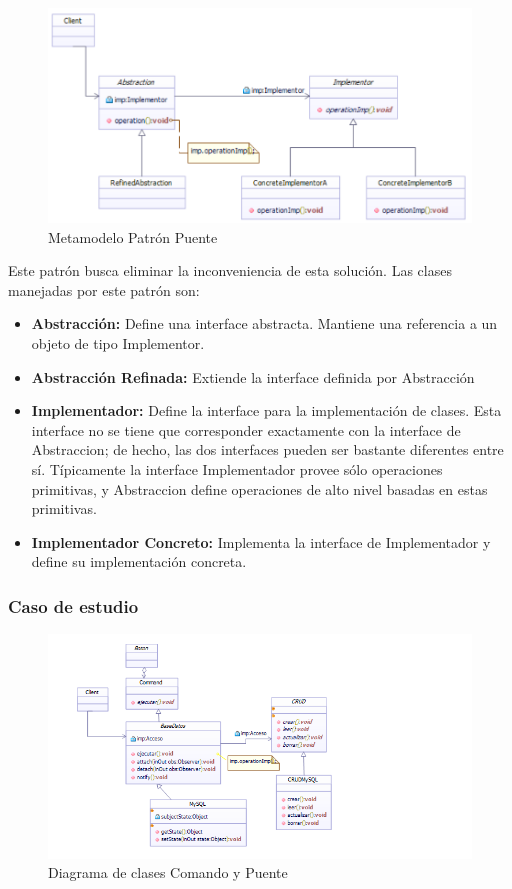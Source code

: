 \begin{figure}[th!]
	\centering
	\includegraphics[width=1\linewidth]{arquitectura/imagenes/modeloPuente}
	\caption{Metamodelo Patrón Puente}
	\label{fig:metamodelo puente}
\end{figure}

Este patrón busca eliminar la inconveniencia de esta solución. Las clases manejadas por este patrón son:
\begin{itemize}
	\item \textbf{Abstracción: }Define una interface abstracta. Mantiene una referencia a un objeto de tipo Implementor.
	\item \textbf{Abstracción Refinada: }Extiende la interface definida por Abstracción 
	\item \textbf{Implementador: }Define la interface para la implementación de clases. Esta interface no se tiene que corresponder exactamente con la interface de Abstraccion; de hecho, las dos interfaces pueden ser bastante diferentes entre sí. Típicamente la interface Implementador provee sólo operaciones primitivas, y Abstraccion define operaciones de alto nivel basadas en estas primitivas.
	\item \textbf{Implementador Concreto: }Implementa la interface de Implementador y define su implementación concreta.
\end{itemize}

\subsubsection{Caso de estudio}

\begin{figure}[th!]
\centering
\includegraphics[width=1.0\linewidth]{arquitectura/imagenes/DiagramaComandoYPuente}
\caption{Diagrama de clases  Comando y Puente}
\end{figure}




